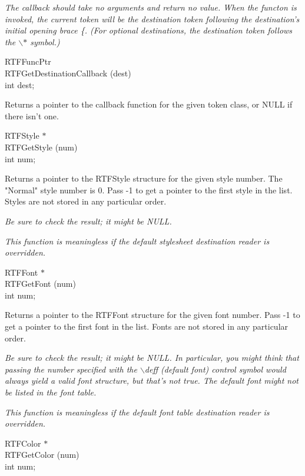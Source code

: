 \documentclass{article}
\begin{document}
\noindent
{\em The callback should take no arguments and return no value. When the 
functon is invoked, the current token will be the destination token following 
the destination's initial opening brace \{. (For optional destinations, the 
destination token follows the $\backslash $$\ast $ symbol.)



}
\noindent
RTFFuncPtr\\
RTFGetDestinationCallback (dest)\\
int	dest;




\noindent
Returns a pointer to the callback function for the given token class, or 
NULL if there isn't one.




\noindent
RTFStyle $\ast $\\
RTFGetStyle (num)\\
int	num;




\noindent
Returns a pointer to the RTFStyle structure for the given style number. The 
"Normal" style number is 0. Pass -1 to get a pointer to the first style in 
the list. Styles are not stored in any particular order.



\noindent
{\em Be sure to check the result; it might be NULL.



\noindent
{\em This function is meaningless if the default stylesheet destination reader 
is overridden.



}}
\noindent
RTFFont $\ast $\\
RTFGetFont (num)\\
int	num;




\noindent
Returns a pointer to the RTFFont structure for the given font number. Pass 
-1 to get a pointer to the first font in the list. Fonts are not stored in 
any particular order.



\noindent
{\em Be sure to check the result; it might be NULL. In particular, you might 
think that passing the number specified with the $\backslash $deff (default 
font) control symbol would always yield a valid font structure, but that's 
not true. The default font might not be listed in the font table.



\noindent
{\em This function is meaningless if the default font table destination reader 
is overridden.



}}
\noindent
RTFColor $\ast $\\
RTFGetColor (num)\\
int	num;
\end{document}
